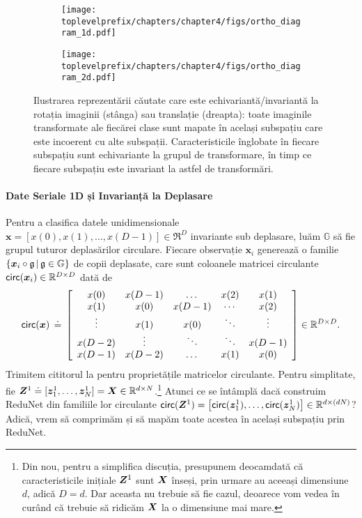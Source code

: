 \documentclass[../../book-main_ro.tex]{subfiles}
\begin{document}
\begin{figure}[t]
    \begin{subfigure}[t]{0.4\textwidth}
        \centering 
        \texttt{[image: \\toplevelprefix/chapters/chapter4/figs/ortho\_diagram\_1d.pdf]}
    \end{subfigure}
    \hfill 
    \begin{subfigure}[t]{0.4\textwidth}
        \centering 
        \texttt{[image: \\toplevelprefix/chapters/chapter4/figs/ortho\_diagram\_2d.pdf]}
    \end{subfigure}
    \caption{Ilustrarea reprezentării căutate care este echivariantă/invariantă la rotația imaginii (stânga) sau translație (dreapta): toate imaginile transformate ale fiecărei clase sunt mapate în același subspațiu care este incoerent cu alte subspații. Caracteristicile înglobate în fiecare subspațiu sunt echivariante la grupul de transformare, în timp ce fiecare subspațiu este invariant la astfel de transformări.}\label{fig:ortho-invariance-diagram} 
\end{figure}

\paragraph{Date Seriale 1D și Invarianță la Deplasare} Pentru a clasifica datele unidimensionale $\bm x = [x(0), x(1), \ldots, x(D-1)] \in \Re^D$ invariante sub deplasare, luăm $\mathbb{G}$ să fie grupul tuturor deplasărilor circulare. Fiecare observație $\bm x_i$ generează o familie $\{ \bm{x}_i \circ \mathfrak{g} \, | \, \mathfrak{g} \in \mathbb G \}$ de copii deplasate, care sunt coloanele matricei circulante $\mathsf{circ}(\bm x_i) \in \mathbb{R}^{D \times D}$ dată de
\begin{equation}
\mathsf{circ}(\bm{x}) \,\doteq\, \left[ \begin{array}{ccccc} x(0) & x(D-1) & \dots & x(2) & x(1) \\ x(1) & x(0) & x(D-1) & \cdots & x(2) \\ \vdots & x(1) & x(0) &\ddots & \vdots \\ x(D-2) &  \vdots & \ddots & \ddots & x(D-1) \\ x(D-1) & x(D-2) & \dots & x(1) & x(0)   \end{array} \right]  \in \mathbb{R}^{D \times D}.
\end{equation}
Trimitem cititorul la \cite{Kra2012OnCM} pentru proprietățile matricelor circulante. Pentru simplitate, fie $\bm Z^1 \doteq [ \bm{z}_{1}^1, \dots, \bm{z}_{N}^1 ] = \bm{X} \in \mathbb{R}^{d \times N}$.\footnote{Din nou, pentru a simplifica discuția, presupunem deocamdată că caracteristicile inițiale $\bm{Z}^1$ sunt $\bm{X}$ înseși, prin urmare au aceeași dimensiune $d$, adică $D=d$. Dar aceasta nu trebuie să fie cazul, deoarece vom vedea în curând că trebuie să ridicăm $\bm{X}$ la o dimensiune mai mare.} Atunci ce se întâmplă dacă construim ReduNet din familiile lor circulante $\mathsf{circ}(\bm Z^1) = \left[ \mathsf{circ}(\bm{z}_{1}^1), \dots, \mathsf{circ}(\bm{z}_{N}^1) \right] \in \mathbb{R}^{d \times (dN)}$? Adică, vrem să comprimăm și să mapăm toate acestea în același subspațiu prin ReduNet. 
\end{document}
